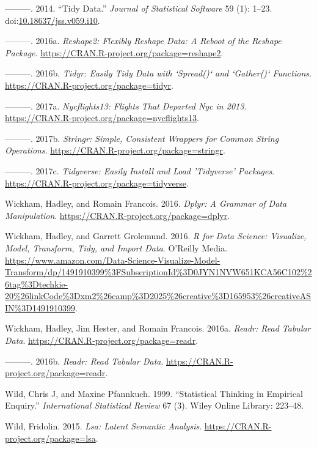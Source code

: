 \documentclass[12pt,]{book}
\begin{document}
\hypertarget{ref-tidydata}{}
---------. 2014. ``Tidy Data.'' \emph{Journal of Statistical Software}
59 (1): 1--23.
doi:\href{https://doi.org/10.18637/jss.v059.i10}{10.18637/jss.v059.i10}.

\hypertarget{ref-R-reshape2}{}
---------. 2016a. \emph{Reshape2: Flexibly Reshape Data: A Reboot of the
Reshape Package}. \url{https://CRAN.R-project.org/package=reshape2}.

\hypertarget{ref-R-tidyr}{}
---------. 2016b. \emph{Tidyr: Easily Tidy Data with `Spread()` and
`Gather()` Functions}. \url{https://CRAN.R-project.org/package=tidyr}.

\hypertarget{ref-R-nycflights13}{}
---------. 2017a. \emph{Nycflights13: Flights That Departed Nyc in
2013}. \url{https://CRAN.R-project.org/package=nycflights13}.

\hypertarget{ref-R-stringr}{}
---------. 2017b. \emph{Stringr: Simple, Consistent Wrappers for Common
String Operations}. \url{https://CRAN.R-project.org/package=stringr}.

\hypertarget{ref-R-tidyverse}{}
---------. 2017c. \emph{Tidyverse: Easily Install and Load 'Tidyverse'
Packages}. \url{https://CRAN.R-project.org/package=tidyverse}.

\hypertarget{ref-R-dplyr}{}
Wickham, Hadley, and Romain Francois. 2016. \emph{Dplyr: A Grammar of
Data Manipulation}. \url{https://CRAN.R-project.org/package=dplyr}.

\hypertarget{ref-r4ds}{}
Wickham, Hadley, and Garrett Grolemund. 2016. \emph{R for Data Science:
Visualize, Model, Transform, Tidy, and Import Data}. O'Reilly Media.
\url{https://www.amazon.com/Data-Science-Visualize-Model-Transform/dp/1491910399\%3FSubscriptionId\%3D0JYN1NVW651KCA56C102\%26tag\%3Dtechkie-20\%26linkCode\%3Dxm2\%26camp\%3D2025\%26creative\%3D165953\%26creativeASIN\%3D1491910399}.

\hypertarget{ref-readr}{}
Wickham, Hadley, Jim Hester, and Romain Francois. 2016a. \emph{Readr:
Read Tabular Data}. \url{https://CRAN.R-project.org/package=readr}.

\hypertarget{ref-R-readr}{}
---------. 2016b. \emph{Readr: Read Tabular Data}.
\url{https://CRAN.R-project.org/package=readr}.

\hypertarget{ref-wild1999statistical}{}
Wild, Chris J, and Maxine Pfannkuch. 1999. ``Statistical Thinking in
Empirical Enquiry.'' \emph{International Statistical Review} 67 (3).
Wiley Online Library: 223--48.

\hypertarget{ref-R-lsa}{}
Wild, Fridolin. 2015. \emph{Lsa: Latent Semantic Analysis}.
\url{https://CRAN.R-project.org/package=lsa}.
\end{document}
